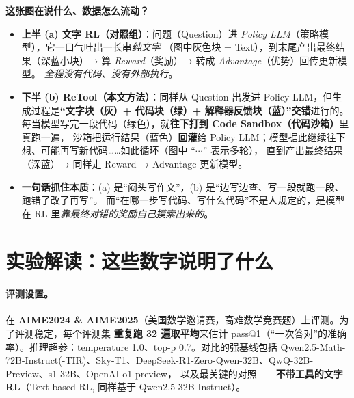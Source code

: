 \documentclass[11pt,UTF8,fontset=fandol]{ctexart}
\begin{document}
\noindent\textbf{这张图在说什么、数据怎么流动？}
\begin{itemize}[leftmargin=1.6em,itemsep=2pt]
  \item \textbf{上半 (a) 文字 RL（对照组）}：问题（Question）进 \emph{Policy LLM}（策略模型），它一口气吐出一长串\emph{纯文字}
  （图中灰色块 = Text），到末尾产出最终结果（深蓝小块）→ 算 \emph{Reward}（奖励）→ 转成 \emph{Advantage}（优势）回传更新模型。
  \emph{全程没有代码、没有外部执行}。
  \item \textbf{下半 (b) ReTool（本文方法）}：同样从 Question 出发进 Policy LLM，但生成过程是\textbf{“文字块（灰）+ 代码块（绿）+
  解释器反馈块（蓝）”交错}进行的。每当模型写完一段代码（绿色），就\textbf{往下打到 Code Sandbox（代码沙箱）}里真跑一遍，
  沙箱把运行结果（蓝色）\textbf{回灌}给 Policy LLM；模型据此继续往下想、可能再写新代码……如此循环（图中 “$\cdots$” 表示多轮），
  直到产出最终结果（深蓝）→ 同样走 Reward → Advantage 更新模型。
  \item \textbf{一句话抓住本质}：(a) 是“闷头写作文”，(b) 是“边写边查、写一段就跑一段、跑错了改了再写”。
  而“在哪一步写代码、写什么代码”不是人规定的，是模型在 RL 里\emph{靠最终对错的奖励自己摸索出来的}。
\end{itemize}

\section{实验解读：这些数字说明了什么}
\label{sec:exp}

\paragraph{评测设置。} 在 \textbf{AIME2024 \& AIME2025}（美国数学邀请赛，高难数学竞赛题）上评测。为了评测稳定，每个评测集
\textbf{重复跑 32 遍取平均}来估计 pass@1（“一次答对”的准确率）。推理超参：temperature 1.0、top-p 0.7。对比的强基线包括
Qwen2.5-Math-72B-Instruct(-TIR)、Sky-T1、DeepSeek-R1-Zero-Qwen-32B、QwQ-32B-Preview、s1-32B、OpenAI o1-preview，
以及最关键的对照——\textbf{不带工具的文字 RL}（Text-based RL, 同样基于 Qwen2.5-32B-Instruct）。
\end{document}
